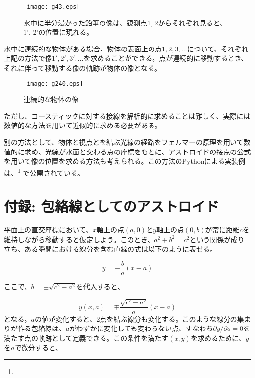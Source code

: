\documentclass[twocolumn]{article}
\begin{document}
	\begin{figure}[ht]
		\centering
		\texttt{[image: g43.eps]}
		\caption{水中に半分浸かった鉛筆の像は、観測点1, 2からそれぞれ見ると、1', 2'の位置に現れる。}
		\label{fig:pencil_view}
	\end{figure}
	
	水中に連続的な物体がある場合、物体の表面上の点$1, 2, 3, \dots$について、それぞれ上記の方法で像$1', 2', 3', \dots$を求めることができる。点が連続的に移動するとき、それに伴って移動する像の軌跡が物体の像となる。
	
	\begin{figure}[ht]
		\centering
		\texttt{[image: g240.eps]}
		\caption{連続的な物体の像}
		\label{fig:extended_image}
	\end{figure}
	
	ただし、コースティックに対する接線を解析的に求めることは難しく、実際には数値的な方法を用いて近似的に求める必要がある。
	
	別の方法として、物体と視点とを結ぶ光線の経路をフェルマーの原理を用いて数値的に求め、光線が水面と交わる点の座標をもとに、アストロイドの接点の公式を用いて像の位置を求める方法も考えられる。この方法のPythonによる実装例は、\href{https://github.com/mingshey/python_projects/blob/main/Refraction_Image.ipynb}%
	{}\footnote{} で公開されている。
	
	\appendix
	\newcommand{\pd}[2]{{\frac{\partial #1}{\partial #2}}}
	\newcommand{\ilpd}[2]{{{\partial #1}/{\partial #2}}}
	\section*{付録: 包絡線としてのアストロイド}
	
	平面上の直交座標において、$x$軸上の点$(a, 0)$と$y$軸上の点$(0, b)$が常に距離$c$を維持しながら移動すると仮定しよう。このとき、$a^2+b^2=c^2$という関係が成り立ち、ある瞬間における線分を含む直線の式は以下のように表せる。
	
	$$y=-\dfrac{b}{a}(x-a)$$
	
	ここで、$b=\pm \sqrt{c^2-a^2}$を代入すると、
	
	$$y(x, a) = \mp \dfrac{\sqrt{c^2-a^2}}{a}(x-a)$$
%	
	となる。$a$の値が変化すると、2点を結ぶ線分も変化する。このような線分の集まりが作る包絡線は、$a$がわずかに変化しても変わらない点、すなわち$\ilpd{y}{a} = 0$を満たす点の軌跡として定義できる。この条件を満たす$(x, y)$を求めるために、$y$を$a$で微分すると、
	
\end{document}
